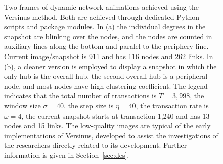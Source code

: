 \documentclass[runningheads]{llncs}
\begin{document}
\begin{figure}[!h]\centering
    \quad
    \caption{Two frames of dynamic network animations achieved using the Versinus method.
    Both are achieved through dedicated Python scripts and package modules.
    In (a) the individual degrees in the snapshot are blinking over the nodes, and the nodes are counted in auxiliary lines along the bottom and paralel to the periphery line. Current image/snapshot is 911 and has 116 nodes and 262 links.
   In (b), a cleaner version is employed to display a snapshot in which the only hub is the overall hub, the second overall hub is a peripheral node, and most nodes have high clustering coefficient. The legend indicates that the total number of transactions is $T=3,998$, the window size $\sigma=40$, the step size is $\eta=40$, the transaction rate is $\omega=4$, the current snapshot starts at transaction 1,240 and has 13 nodes and 15 links.
   The low-quality images are typical of the early implementations of Versinus, developed to assist the investigations of the researchers directly related to its development.
   Further information is given in Section~\ref{sec:des}.
   }%
    \label{fig:final}%
\end{figure}
\end{document}

